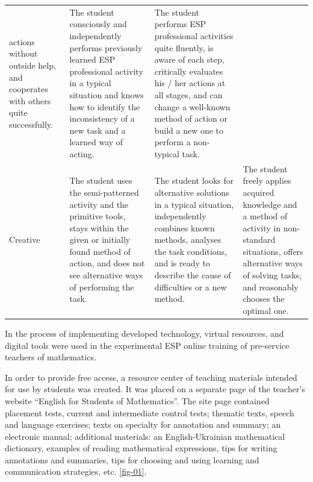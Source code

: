 \begin{table}[!htpb]
\begin{threeparttable}
\begin{tabular}{ l p{4cm} p{4cm} p{4cm}}
				actions without outside help, and cooperates with others quite
				successfully. & The student consciously and independently performs
				previously learned ESP professional activity in a typical situation and
				knows how to identify the inconsistency of a new task and a learned way
				of acting. & The student performs ESP professional activities quite
				fluently, is aware of each step, critically evaluates his / her actions
				at all stages, and can change a well-known method of action or build a
				new one to perform a non-typical task. \\
				Creative & The student uses the semi-patterned activity and the
				primitive tools, stays within the given or initially found method of
				action, and does not see alternative ways of performing the task. & The
				student looks for alternative solutions in a typical situation,
				independently combines known methods, analyses the task conditions, and
				is ready to describe the cause of difficulties or a new method. & The
				student freely applies acquired knowledge and a method of activity in
				non-standard situations, offers alternative ways of solving tasks, and
				reasonably chooses the optimal one. \\
				\bottomrule
            \end{tabular}
		\end{threeparttable}
	\end{table}

In the process of implementing developed technology, virtual resources,
and digital tools were used in the experimental ESP online training of
pre-service teachers of mathematics.

In order to provide free access, a resource center of teaching materials
intended for use by students was created. It was placed on a separate
page of the teacher's website \enquote{English for Students of Mathematics}.
The site page contained placement tests, current and intermediate
control tests; thematic texts, speech and language exercises; texts on
specialty for annotation and summary; an electronic manual; additional
materials: an English-Ukrainian mathematical dictionary, examples of
reading mathematical expressions, tips for writing annotations and
summaries, tips for choosing and using learning and communication
strategies, etc. \cref{fig-01}.

